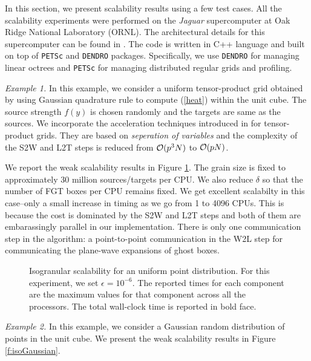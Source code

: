 In this section, we present scalability results using a few test cases.  All the scalability experiments were performed 
on the {\it{Jaguar}} supercomputer at Oak Ridge National Laboratory (ORNL). The architectural details for this supercomputer
 can be found in \cite{jaguar}. The code is written in C++ language and built on top of \texttt{PETSc} and \texttt{DENDRO} packages. 
 Specifically, we use \texttt{DENDRO} for managing linear octrees and \texttt{PETSc} for managing distributed regular grids and profiling. 


{\em Example 1.} In this example, we consider a uniform tensor-product grid obtained by using Gaussian quadrature rule to compute (\ref{heat}) within the unit cube. The source strength $f(y)$ is chosen randomly and the targets are same as the sources. We incorporate the acceleration techniques introduced in \cite{fggt} for tensor-product grids. They are based on 
{\em seperation of variables} and the complexity of the S2W and L2T steps is reduced from $\mathcal{O}(p^3 N)$ to $\mathcal{O}(p N)$. 

We report the weak scalability results in Figure \ref{f:isoUniform}. The grain size is fixed to approximately 30 million sources/targets per CPU. We also reduce $\delta$ so that the number of FGT boxes per CPU remains fixed. We get excellent scalabilty in this case--only a small increase in timing as we go from 1 to 4096 CPUs. This is  because the cost is dominated by the S2W and L2T steps and both of them are embarassingly parallel in our implementation. There is only one communication step in the algorithm: a point-to-point communication in the W2L step for communicating the plane-wave expansions of ghost boxes.

\begin{figure}
	\begin{center}
	
	\end{center}
\caption{\label{f:isoUniform} Isogranular scalability for an uniform point distribution. For
 this experiment, we set $\epsilon = 10^{-6}$. The reported times for 
each component are the maximum values for that component across all the processors. The total wall-clock
time is reported in bold face.} 
\end{figure}

{\em Example 2.} In this example, we consider a Gaussian random distribution of points in the unit cube. 
We present the weak scalability results in Figure \ref{f:isoGaussian}. 

